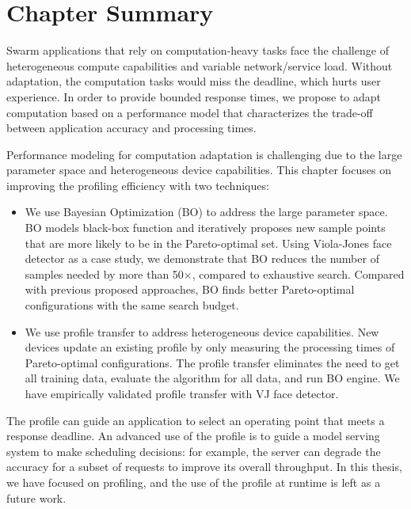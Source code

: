 \section{Chapter Summary}
\label{sec:chap-summary}

Swarm applications that rely on computation-heavy tasks face the challenge of
heterogeneous compute capabilities and variable network/service load. Without
adaptation, the computation tasks would miss the deadline, which hurts user
experience. In order to provide bounded response times, we propose to adapt
computation based on a performance model that characterizes the trade-off
between application accuracy and processing times.

Performance modeling for computation adaptation is challenging due to the large
parameter space and heterogeneous device capabilities. This chapter focuses on
improving the profiling efficiency with two techniques:

\begin{itemize}[topsep=5pt, itemsep=5pt]
\item We use Bayesian Optimization (BO) to address the large parameter space. BO
  models black-box function and iteratively proposes new sample points that are
  more likely to be in the Pareto-optimal set. Using Viola-Jones face detector
  as a case study, we demonstrate that BO reduces the number of samples needed
  by more than 50$\times$, compared to exhaustive search. Compared with previous
  proposed approaches, BO finds better Pareto-optimal configurations with the
  same search budget.
\item We use profile transfer to address heterogeneous device capabilities. New
  devices update an existing profile by only measuring the processing times of
  Pareto-optimal configurations. The profile transfer eliminates the need to get
  all training data, evaluate the algorithm for all data, and run BO engine. We
  have empirically validated profile transfer with VJ face detector.
\end{itemize}

The profile can guide an application to select an operating point that meets a
response deadline. An advanced use of the profile is to guide a model serving
system to make scheduling decisions: for example, the server can degrade the
accuracy for a subset of requests to improve its overall throughput. In this
thesis, we have focused on profiling, and the use of the profile at runtime is
left as a future work.


